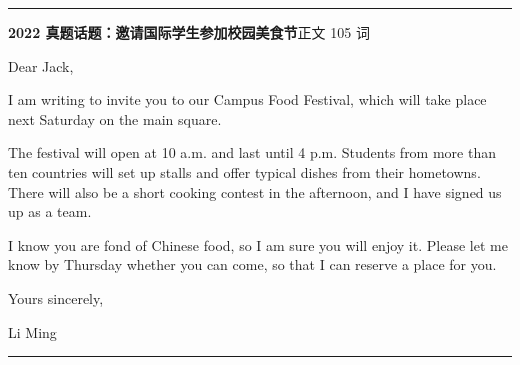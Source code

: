 \documentclass[10pt,a4paper]{ctexart}
\begin{document}
\endgroup
\vspace{4pt}\par\nopagebreak
{\color{rule}\rule{\linewidth}{0.6pt}}\par\nopagebreak
\vspace{1pt}
\vspace{2pt}\noindent\colorbox{soft}{\parbox{\dimexpr\linewidth-2\fboxsep\relax}{%
\vspace{2pt}
{\footnotesize\bfseries\color{accent}2022 真题话题：邀请国际学生参加校园美食节}\hfill{\footnotesize\color{gray}正文 105 词}
\par\vspace{2pt}
\footnotesize Dear Jack,\par
\footnotesize I am writing to invite you to our Campus Food Festival, which will take place next Saturday on the main square.\par
\footnotesize The festival will open at 10 a.m. and last until 4 p.m. Students from more than ten countries will set up stalls and offer typical dishes from their hometowns. There will also be a short cooking contest in the afternoon, and I have signed us up as a team.\par
\footnotesize I know you are fond of Chinese food, so I am sure you will enjoy it. Please let me know by Thursday whether you can come, so that I can reserve a place for you.\par
\footnotesize Yours sincerely,\par
\footnotesize Li Ming\par
\par{}
\par\vspace{1pt}}}\par
\vspace{2pt}
\vspace{4pt}\par\nopagebreak
{\color{rule}\rule{\linewidth}{0.6pt}}\par\nopagebreak
\vspace{1pt}
\vspace{1pt}\begingroup\setlength{\parindent}{0pt}
\end{document}
